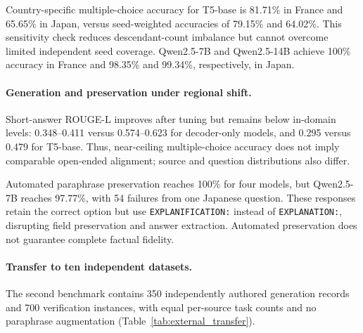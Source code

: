 \documentclass[a4paper,fleqn]{cas-sc}
\begin{document}
Country-specific multiple-choice accuracy for T5-base is 81.71\% in France and 65.65\% in Japan, versus seed-weighted accuracies of 79.15\% and 64.02\%. This sensitivity check reduces descendant-count imbalance but cannot overcome limited independent seed coverage. Qwen2.5-7B and Qwen2.5-14B achieve 100\% accuracy in France and 98.35\% and 99.34\%, respectively, in Japan.

\paragraph{Generation and preservation under regional shift.}
Short-answer ROUGE-L improves after tuning but remains below in-domain levels: 0.348--0.411 versus 0.574--0.623 for decoder-only models, and 0.295 versus 0.479 for T5-base. Thus, near-ceiling multiple-choice accuracy does not imply comparable open-ended alignment; source and question distributions also differ.

Automated paraphrase preservation reaches 100\% for four models, but Qwen2.5-7B reaches 97.77\%, with 54 failures from one Japanese question. These responses retain the correct option but use \texttt{EXPLANIFICATION:} instead of \texttt{EXPLANATION:}, disrupting field preservation and answer extraction. Automated preservation does not guarantee complete factual fidelity.

\paragraph{Transfer to ten independent datasets.}
The second benchmark contains 350 independently authored generation records and 700 verification instances, with equal per-source task counts and no paraphrase augmentation (Table~\ref{tab:external_transfer}).
\end{document}
